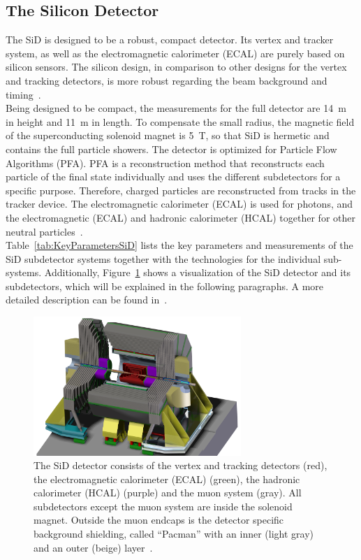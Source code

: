 \subsection{The Silicon Detector}
The SiD is designed to be a robust, compact detector.
Its vertex and tracker system, as well as the electromagnetic calorimeter (ECAL) are purely based on silicon sensors.
The silicon design, in comparison to other designs for the vertex and tracking detectors, is more robust regarding the beam background and timing~\cite[cf. p. 57ff]{TDR4}.
\\Being designed to be compact, the measurements for the full detector are \SI{14}{m} in height and \SI{11}{m} in length.
To compensate the small radius, the magnetic field of the superconducting solenoid magnet is \SI{5}{T}, so that SiD is hermetic and contains the full particle showers.
The detector is optimized for Particle Flow Algorithms (PFA).
PFA is a reconstruction method that reconstructs each particle of the final state individually and uses the different subdetectors for a specific purpose.
Therefore, charged particles are reconstructed from tracks in the tracker device.
The electromagnetic calorimeter (ECAL) is used for photons, and the electromagnetic (ECAL) and hadronic calorimeter (HCAL) together for other neutral particles~\cite{PFA}.
\\Table~\ref{tab:KeyParametersSiD} lists the key parameters and measurements of the SiD subdetector systems together with the technologies for the individual sub-systems.
Additionally, Figure~\ref{fig:SiD} shows a visualization of the SiD detector and its subdetectors, which will be explained in the following paragraphs.
A more detailed description can be found in~\cite{TDR4}.
\begin{figure}[h]
\centering
\includegraphics[width=0.7\textwidth]{Figures/SiD_new.jpg}
\caption[Visualization of the SiD detector]{The SiD detector consists of the vertex and tracking detectors (red), the electromagnetic calorimeter (ECAL) (green), the hadronic calorimeter (HCAL) (purple) and the muon system (gray).
All subdetectors except the muon system are inside the solenoid magnet.
Outside the muon endcaps is the detector specific background shielding, called ``Pacman'' with an inner (light gray) and an outer (beige) layer~\cite{SiD_Geo}.}
\label{fig:SiD}
\end{figure}

